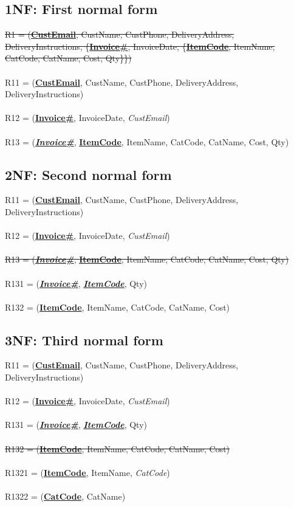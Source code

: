 \subsection{1NF: First normal form}

\sout{R1 = (\textbf{\underline{CustEmail}}, CustName, CustPhone, DeliveryAddress, DeliveryInstructions, \{\textbf{\underline{Invoice\#}}, InvoiceDate, \{\textbf{\underline{ItemCode}}, ItemName, CatCode, CatName, Cost, Qty\}\})}
\\\\
R11 = (\textbf{\underline{CustEmail}}, CustName, CustPhone, DeliveryAddress, DeliveryInstructions)
\\\\
R12 = (\textbf{\underline{Invoice\#}}, InvoiceDate, \emph{CustEmail})
\\\\
R13 = (\textbf{\underline{\emph{Invoice\#}}}, \textbf{\underline{ItemCode}}, ItemName, CatCode, CatName, Cost, Qty)

\subsection{2NF: Second normal form}

R11 = (\textbf{\underline{CustEmail}}, CustName, CustPhone, DeliveryAddress, DeliveryInstructions)
\\\\
R12 = (\textbf{\underline{Invoice\#}}, InvoiceDate, \emph{CustEmail})
\\\\
\sout{R13 = (\textbf{\underline{\emph{Invoice\#}}}, \textbf{\underline{ItemCode}}, ItemName, CatCode, CatName, Cost, Qty)}
\\\\
R131 = (\textbf{\underline{\emph{Invoice\#}}}, \textbf{\underline{\emph{ItemCode}}}, Qty)
\\\\
R132 = (\textbf{\underline{ItemCode}}, ItemName, CatCode, CatName, Cost)

\subsection{3NF: Third normal form}

R11 = (\textbf{\underline{CustEmail}}, CustName, CustPhone, DeliveryAddress, DeliveryInstructions)
\\\\
R12 = (\textbf{\underline{Invoice\#}}, InvoiceDate, \emph{CustEmail})
\\\\
R131 = (\textbf{\underline{\emph{Invoice\#}}}, \textbf{\underline{\emph{ItemCode}}}, Qty)
\\\\
\sout{R132 = (\textbf{\underline{ItemCode}}, ItemName, CatCode, CatName, Cost)}
\\\\
R1321 = (\textbf{\underline{ItemCode}}, ItemName, \emph{CatCode})
\\\\
R1322 = (\textbf{\underline{CatCode}}, CatName)


